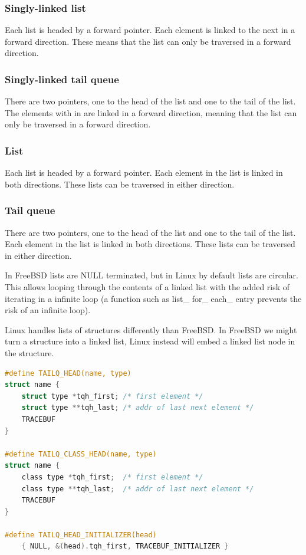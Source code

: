 \documentclass[letterpaper, 10pt, onecolumn, draftclsnofoot]{IEEEtran}
\begin{document}
\subsubsection{Singly-linked list}
Each list is headed by a forward pointer. Each element is linked to the next in a forward direction. These means that the list can only be traversed in a forward direction.\cite{queue_h}
\subsubsection{Singly-linked tail queue}
There are two pointers, one to the head of the list and one to the tail of the list. The elements with in are linked in a forward direction, meaning that the list can only be traversed in a forward direction.\cite{queue_h}
\subsubsection{List}
Each list is headed by a forward pointer. Each element in the list is linked in both directions. These lists can be traversed in either direction.\cite{queue_h}
\subsubsection{Tail queue}
There are two pointers, one to the head of the list and one to the tail of the list. Each element in the list is linked in both directions. These lists can be traversed in either direction.\cite{queue_h}

In FreeBSD lists are NULL terminated, but in Linux by default lists are circular. This allows looping through the contents of a linked list with the added risk of iterating in a infinite loop (a function such as list\_ for\_ each\_ entry prevents the risk of an infinite loop).\cite{linux}

Linux handles lists of structures differently than FreeBSD. In FreeBSD we might turn a structure into a linked list, Linux instead will embed a linked list node in the structure.\cite{linux}

\begin{lstlisting}[language=C]
#define	TAILQ_HEAD(name, type)						
struct name {								
	struct type *tqh_first;	/* first element */			
	struct type **tqh_last;	/* addr of last next element */		
	TRACEBUF							
}

#define	TAILQ_CLASS_HEAD(name, type)					
struct name {								
	class type *tqh_first;	/* first element */			
	class type **tqh_last;	/* addr of last next element */		
	TRACEBUF							
}

#define	TAILQ_HEAD_INITIALIZER(head)					
	{ NULL, &(head).tqh_first, TRACEBUF_INITIALIZER }
\end{lstlisting}
\end{document}
